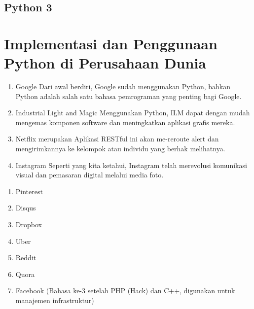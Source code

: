 \documentclass{article}
\begin{document}
\subsection{Python 3}
\usepackage{Python versi 3.0. Nama Python dipilih oleh Guido sebagai nama bahasa ciptaannya karena kecintaan guido pada sebuah acara televisi Monty Python's Flying Circus. Oleh karena itu seringkali ungkapan-ungkapan khas dari acara tersebut sering muncul dalam korespondensi antar pengguna Python. Python Versi 3 merupakan perkembangan dari Python versi 2 dan lebih banyak memiliki fitur terbaru dibandingkan Python 2. Untuk membuka Python versi 3 menggunkan perintah Python3.}

\section{Implementasi dan Penggunaan Python di Perusahaan Dunia}
\usepackage{Seperti yang sudah diketahui, Python telah banyak digunakan oleh lingkungan akademis dan startup karena Python sederhana. Namun, seringkali solusi sederhana adalah yang paling terbaik. Semakin kompleks aplikasi, maka semakin terbuka kemungkinan untuk melakukan kesalahan, banyak perusahaan besar yang tidak mau dengan kesalahan karena akan menrusak reputasi mereka, karenanyalah kenapa banyak perusahaan dan aplikasi besar menggunakan Python, dengan tools yang sederhana, terbukti dapat melahirkan aplikasi yang sangat mengagumkan. Berikut beberapa perusahaan dunia yang menggunakan Python.}
\begin{enumerate}
    \item Google Dari awal berdiri, Google sudah menggunakan Python, bahkan Python adalah salah satu bahasa pemrograman yang penting bagi Google.
    \item Industrial Light and Magic Menggunakan Python, ILM dapat dengan mudah mengemas komponen software dan meningkatkan aplikasi grafis mereka.
    \item Netflix merupakan Aplikasi RESTful ini akan me-reroute alert dan mengirimkannya ke kelompok atau individu yang berhak melihatnya. 
    \item Instagram Seperti yang kita ketahui, Instagram telah merevolusi komunikasi visual dan pemasaran digital melalui media foto.
    \end{enumerate}
\usepackage{Selain perusahaan yang ada diatas, ada beberapa perusahaan lain yang menggunakan Python.}
\begin{enumerate}
    \item Pinterest
    \item Disqus
    \item Dropbox
    \item Uber
    \item Reddit
    \item Quora
    \item Facebook (Bahasa ke-3 setelah PHP (Hack) dan C++, digunakan untuk manajemen infrastruktur)
    \end{enumerate}
    
\end{document}
